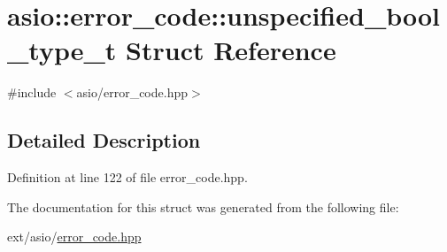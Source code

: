 \hypertarget{structasio_1_1error__code_1_1unspecified__bool__type__t}{}\section{asio\+:\+:error\+\_\+code\+:\+:unspecified\+\_\+bool\+\_\+type\+\_\+t Struct Reference}
\label{structasio_1_1error__code_1_1unspecified__bool__type__t}


{\ttfamily \#include $<$asio/error\+\_\+code.\+hpp$>$}



\subsection{Detailed Description}


Definition at line 122 of file error\+\_\+code.\+hpp.



The documentation for this struct was generated from the following file\+:\begin{DoxyCompactItemize}
\item 
ext/asio/\hyperlink{error__code_8hpp}{error\+\_\+code.\+hpp}\end{DoxyCompactItemize}
